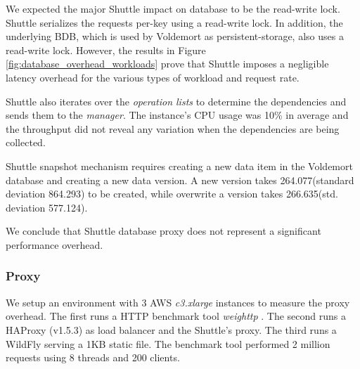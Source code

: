 We expected the major Shuttle impact on database to be the read-write lock. Shuttle serializes the requests per-key using a read-write lock. In addition, the underlying \ac{BDB}, which is used by Voldemort as persistent-storage, also uses a read-write lock. However, the results in Figure \ref{fig:database_overhead_workloads} prove that Shuttle imposes a negligible latency overhead for the various types of workload and request rate.  

Shuttle also iterates over the \emph{operation lists} to determine the dependencies and sends them to the \emph{manager}. The instance's CPU usage was 10\% in average and the throughput did not reveal any variation when the dependencies are being collected. 

Shuttle snapshot mechanism requires creating a new data item in the Voldemort database and creating a new data version. A new version takes 264.077\us (standard deviation 864.293\us) to be created, while overwrite a version takes 266.635\us (std. deviation 577.124\us).

We conclude that Shuttle database proxy does not represent a significant performance overhead. %


\subsubsection{Proxy}\label{sec:eval:performance:proxy}
We setup an environment with 3 \ac{AWS} \textit{c3.xlarge} instances to measure the proxy overhead. The first runs a \ac{HTTP} benchmark tool \emph{weighttp} \cite{weighttp}. The second runs a HAProxy (v1.5.3) as load balancer and the Shuttle's proxy. The third runs a WildFly serving a 1KB static file. The benchmark tool performed 2 million requests using 8 threads and 200 clients.

